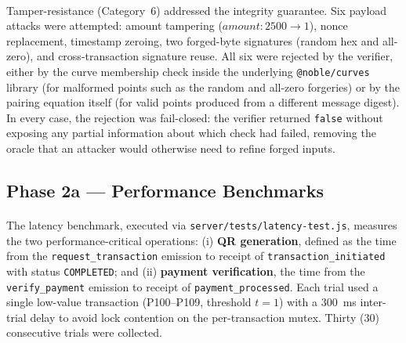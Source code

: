 \paragraph{}Tamper-resistance (Category~6) addressed the integrity guarantee. Six payload attacks were attempted: amount tampering ($\textit{amount}: 2500 \to 1$), nonce replacement, timestamp zeroing, two forged-byte signatures (random hex and all-zero), and cross-transaction signature reuse. All six were rejected by the verifier, either by the curve membership check inside the underlying \texttt{@noble/curves} library (for malformed points such as the random and all-zero forgeries) or by the pairing equation itself (for valid points produced from a different message digest). In every case, the rejection was fail-closed: the verifier returned \texttt{false} without exposing any partial information about which check had failed, removing the oracle that an attacker would otherwise need to refine forged inputs.

\subsection{Phase 2a --- Performance Benchmarks}
\label{sect:results_perf}

\paragraph{}The latency benchmark, executed via \texttt{server/tests/latency-test.js}, measures the two performance-critical operations: (i) \textbf{QR generation}, defined as the time from the \texttt{request\_transaction} emission to receipt of \texttt{transaction\_initiated} with status \texttt{COMPLETED}; and (ii) \textbf{payment verification}, the time from the \texttt{verify\_payment} emission to receipt of \texttt{payment\_processed}. Each trial used a single low-value transaction (₱100--₱109, threshold $t = 1$) with a 300~ms inter-trial delay to avoid lock contention on the per-transaction mutex. Thirty (30) consecutive trials were collected.

